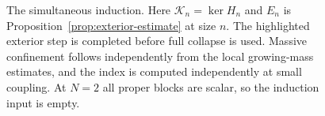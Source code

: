 \begin{figure}[!htbp]
\caption{The simultaneous induction. Here $\mathcal K_n=\ker H_n$ and
$E_n$ is Proposition~\ref{prop:exterior-estimate} at size $n$.
The highlighted exterior step is completed before full collapse is
used. Massive confinement follows independently from the local
growing-mass estimates, and the index is computed independently at
small coupling. At $N=2$ all proper blocks are scalar, so the induction
input is empty.}
\label{fig:induction}
\end{figure}
